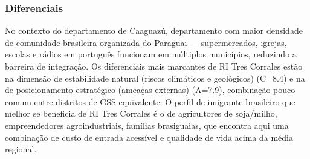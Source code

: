 \subsubsection*{Diferenciais}\label{dif-ri-tres-corrales-0518}
No contexto do departamento de Caaguazú, departamento com maior densidade de comunidade brasileira organizada do Paraguai — supermercados, igrejas, escolas e rádios em português funcionam em múltiplos municípios, reduzindo a barreira de integração. Os diferenciais mais marcantes de RI Tres Corrales estão na dimensão de estabilidade natural (riscos climáticos e geológicos) (C=8.4) e na de posicionamento estratégico (ameaças externas) (A=7.9), combinação pouco comum entre distritos de GSS equivalente. O perfil de imigrante brasileiro que melhor se beneficia de RI Tres Corrales é o de agricultores de soja/milho, empreendedores agroindustriais, famílias brasiguaias, que encontra aqui uma combinação de custo de entrada acessível e qualidade de vida acima da média regional.

